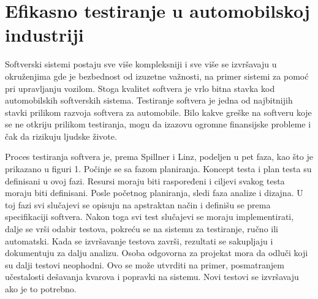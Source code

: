 \documentclass[a4paper]{article}
\begin{document}
\section{Efikasno testiranje u automobilskoj industriji}
\label{sec:efikasno}

Softverski sistemi postaju sve više kompleksniji i sve više se izvršavaju u okruženjima gde je bezbednost od izuzetne važnosti, na primer sistemi za pomoć pri upravljanju vozilom. Stoga kvalitet softvera je vrlo bitna stavka kod automobilskih softverskih sistema. Testiranje softvera je jedna od najbitnijih stavki prilikom razvoja softvera za automobile. Bilo kakve greške na softveru koje se ne otkriju prilikom testiranja, mogu da izazovu ogromne finansijske probleme i čak da rizikuju ljudske živote.
\bigbreak

Proces testiranja softvera je, prema Spillner i Linz, podeljen u pet faza, kao što je prikazano u figuri 1. Počinje se sa fazom planiranja. Koncept testa i plan testa su definisani u ovoj fazi. Resursi moraju biti raspoređeni i ciljevi svakog testa moraju biti definisani. Posle početnog planiranja, sledi faza analize i dizajna. U toj fazi svi slučajevi se opisuju na apstraktan način i definišu se prema specifikaciji softvera. Nakon toga svi test slučajevi se moraju implementirati, dalje se vrši odabir testova, pokreću se na sistemu za testiranje, ručno ili automatski. Kada se izvršavanje testova završi, rezultati se sakupljaju i dokumentuju za dalju analizu. Osoba odgovorna za projekat mora da odluči koji su dalji testovi neophodni. Ovo se može utvrditi na primer, posmatranjem učestalosti dešavanja kvarova i popravki na sistemu. Novi testovi se izvršavaju ako je to potrebno.

\bigbreak
\end{document}
